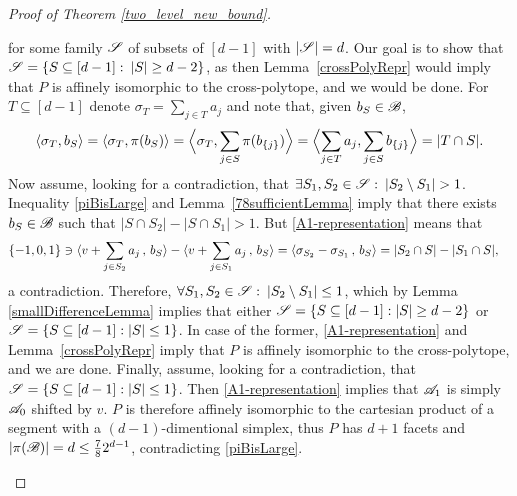 \begin{proof}[Proof of Theorem \ref{two_level_new_bound}]
\begin{enumerate}
        for some family ${\mathscr{S}}$ of subsets of $[d-1]$ with $|{\mathscr{S}}| = d$. Our goal is to show that ${{\mathscr{S}}= \{S\subseteq[d-1]:\:|S|\geq d-2\}}$, as then Lemma~\ref{crossPolyRepr} would imply that $P$ is affinely isomorphic to the cross-polytope, and we would be done. For $T \subseteq [d-1]$ denote $\sigma_T=\sum_{j\in T} a_j$ and note that, given $b_S\in {\mathscr{B}}$,
        \[
            \langle \sigma_T, b_S \rangle = \langle \sigma_T, \pi(b_S) \rangle = \Bigl< \sigma_T, \sum_{j\in S}\pi(b_{\{j\}}) \Bigr> = \Bigl< \sum_{j\in T} a_j, \sum_{j\in S}b_{\{j\}} \Bigr> = |T \cap S|.
        \]
        Now assume, looking for a contradiction, that $\exists S_1, S_2 \in {\mathscr{S}}:\:|S_2\setminus S_1| > 1$. Inequality \eqref{piBisLarge} and Lemma~\ref{78sufficientLemma} imply that there exists $b_S\in {\mathscr{B}}$ such that $|S \cap S_2| - |S \cap S_1| > 1$. But \eqref{A1-representation}
        means that
        \begin{align*}
            \{-1,0,1\} & \ni \langle v+\sum_{j \in S_2}  a_j\,,\,b_{S}\rangle - \langle v+\sum_{j \in S_1} a_j\,,\, b_{S} \rangle = \langle \sigma_{S_2} - \sigma_{S_1}\,,\, b_{S} \rangle 
            = |S_2 \cap S| - |S_1 \cap S|,
        \end{align*}
        a contradiction. Therefore, $\forall S_1, S_2 \in {\mathscr{S}}:\:|S_2\setminus S_1| \leq 1$, which by Lemma \ref{smallDifferenceLemma} implies that either ${\mathscr{S}} = \{S\subseteq[d-1]: |S| \geq d-2\}$ or ${\mathscr{S}} = \{S\subseteq[d-1]: |S| \leq 1\}$. In case of the former, \eqref{A1-representation} and Lemma~\ref{crossPolyRepr} imply that $P$ is affinely isomorphic to the cross-polytope, and we are done. Finally, assume, looking for a contradiction, that ${\mathscr{S}} = \{S\subseteq[d-1]: |S| \leq 1\}$. Then \eqref{A1-representation} implies that ${\mathscr{A}}_1$ is simply ${\mathscr{A}}_0$ shifted by $v$. $P$ is therefore affinely isomorphic to the cartesian product of a segment with a $(d-1)$-dimentional simplex, thus $P$ has $d+1$ facets and $|\pi({\mathscr{B}})| = d \leq \frac{7}{8} 2^{d-1}$, contradicting \eqref{piBisLarge}.
    \end{enumerate}
\end{proof}

